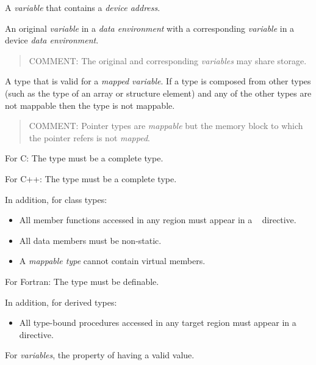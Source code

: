 \glossarydefstart
A \emph{variable} that contains a \emph{device address}.
\glossarydefend


\glossarydefstart
An original \emph{variable} in a \emph{data environment} with a corresponding \emph{variable} in a 
device \emph{data environment}.

\begin{quote}
COMMENT: The original and corresponding \emph{variables} may share storage.
\end{quote}
\glossarydefend

\glossarydefstart
A type that is valid for a \emph{mapped variable}. If a type is composed from other types 
(such as the type of an array or structure element) and any of the other types are 
not mappable then the type is not mappable.

\begin{quote}
COMMENT: Pointer types are \emph{mappable} but the memory block to which the pointer refers is not \emph{mapped}.
\end{quote}

For C: 
\nopagebreak
The type must be a complete type.

For C++: 
\nopagebreak
The type must be a complete type.

In addition, for class types:
\begin{itemize}
\item All member functions accessed in any  region must appear in a 
~ directive.

\item All data members must be non-static.

\item A \emph{mappable type} cannot contain virtual members. 
\end{itemize}

For Fortran: 
\nopagebreak
The type must be definable.

In addition, for derived types:

\begin{itemize}
\item All type-bound procedures accessed in any target region must appear in a ~ directive.
\end{itemize}
\glossarydefend

\glossarydefstart
For \emph{variables}, the property of having a valid value.

